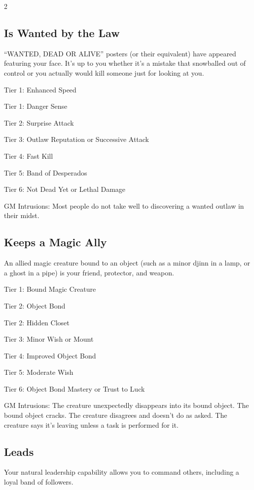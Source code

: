 \begin{multicols}{2}
\subsection{Is Wanted by the Law}

“WANTED, DEAD OR ALIVE” posters (or their equivalent) have appeared featuring your face. It’s up to you whether it’s a mistake that snowballed out of control or you actually would kill someone just for looking at you.

Tier 1: Enhanced Speed

Tier 1: Danger Sense

Tier 2: Surprise Attack

Tier 3: Outlaw Reputation or Successive Attack

Tier 4: Fast Kill

Tier 5: Band of Desperados

Tier 6: Not Dead Yet or Lethal Damage

GM Intrusions: Most people do not take well to discovering a wanted outlaw in their midst.

\subsection{Keeps a Magic Ally}

An allied magic creature bound to an object (such as a minor djinn in a lamp, or a ghost in a pipe) is your friend, protector, and weapon.

Tier 1: Bound Magic Creature

Tier 2: Object Bond

Tier 2: Hidden Closet

Tier 3: Minor Wish or Mount

Tier 4: Improved Object Bond

Tier 5: Moderate Wish

Tier 6: Object Bond Mastery or Trust to Luck

GM Intrusions: The creature unexpectedly disappears into its bound object. The bound object cracks. The creature disagrees and doesn’t do as asked. The creature says it’s leaving unless a task is performed for it.

\subsection{Leads}

Your natural leadership capability allows you to command others, including a loyal band of followers.


\end{multicols}
